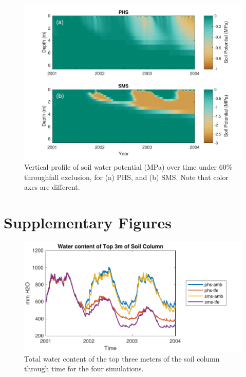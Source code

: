 \documentclass[draft,linenumbers]{agujournal}
\begin{document}
  
      \clearpage
    \begin{figure}[h]
     \centering
     \includegraphics[width=30pc]{../figs2/fig11.pdf}
     \caption{Vertical profile of soil water potential (MPa) over time under 60\% throughfall exclusion, for
     (a) PHS, and 
     (b) SMS.
     Note that color axes are different. }
     \label{fig:sm}
  \end{figure}


\clearpage

\appendix

\section{Supplementary Figures}

      \begin{figure}[h]
     \centering
     \includegraphics[width=30pc]{../figs2/top3m.pdf}
     \caption{Total water content of the top three meters of the soil column through time for the four simulations.}
     \label{top3m}
  \end{figure}
  \clearpage
  
\end{document}
